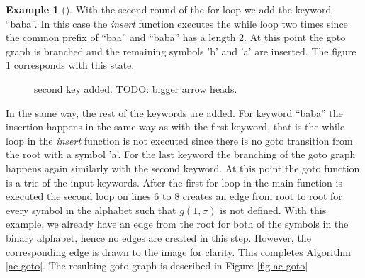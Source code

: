 \documentclass[english,twoside,censored,csm,algorithms-track-2020]{HYthesisML}
\theoremstyle{plain}
\theoremstyle{definition}
\newtheorem{example}[theorem]{Example}
\begin{document}
\begin{example}[]
  With the second round of the for loop we add the keyword ``baba''. In this case the \textit{insert}
  function executes the while loop two times since the common prefix of ``baa'' and ``baba'' has a length
  2. At this point the goto graph is branched and the remaining symbols 'b' and 'a' are inserted. The
  figure \ref{fig-ac-step3} corresponds with this state.

  \begin{figure}[h]
  \centering
  \caption{second key added. TODO: bigger arrow heads.} \label{fig-ac-step3}
\end{figure}

  In the same way, the rest of the keywords are added. For keyword ``baba'' the insertion
  happens in the same way as with the first keyword, that is the while loop in the \textit{insert}
  function is not executed since there is no goto transition from the root with a symbol 'a'.
  For the last keyword the branching of the goto graph happens again
  similarly with the second keyword. At this point the goto function is a trie of the
  input keywords. After the first for loop in the main function is executed
  the second loop on lines 6 to 8 creates an edge from root to root for every symbol in the
  alphabet such that $g(1,\sigma)$ is not defined. With this example, we already have an edge from the
  root for both of the symbols in the binary alphabet, hence no edges are created in this step.
  However, the corresponding edge is drawn to the image for clarity. This completes 
  Algorithm \ref{ac-goto}.
  The resulting goto graph is described in Figure \ref{fig-ac-goto}

  \begin{figure}[h]
  \centering
  \begin{tikzpicture}


\end{tikzpicture}
\end{figure}
\end{example}
\end{document}
